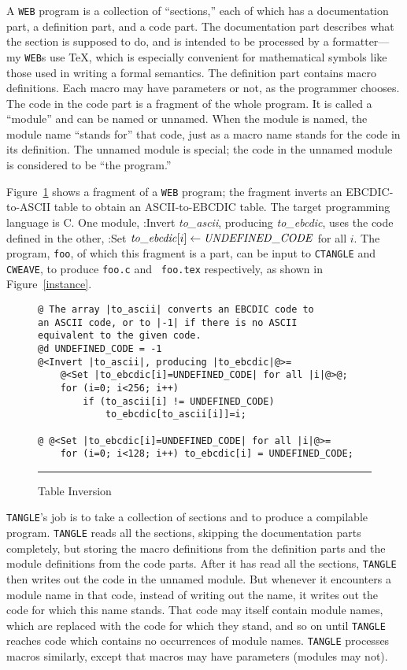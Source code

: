 A {\tt WEB} program is a collection of ``sections,'' each of which has a
documentation part, a definition part, and a code part.
The documentation part describes what the section is supposed to do,
and is intended to be processed by a formatter---my {\tt WEB}s use
{\TeX}, which is especially convenient for mathematical symbols like
those used in writing a formal semantics.
The definition part contains macro definitions.
Each macro may have parameters or not, as the programmer chooses.
The code in the code part is a fragment of the whole program.
It is called a ``module'' and can be named or unnamed.
When the module is named, the module name ``stands for'' that code,
just as a macro name stands for the code in its definition.
The unnamed module is special; the code in the unnamed module is
considered to be ``the program.''

Figure~\ref{fragment} shows a fragment of a {\tt WEB} program; the
fragment inverts an 
EBCDIC-to-ASCII table to obtain an ASCII-to-EBCDIC table.
The target programming language is C.
One module, \X:Invert {\it to\_ascii}, producing {\it to\_ebcdic}\X,
uses the code defined in the other, \X:Set ${\it
to\_ebcdic}[i]\leftarrow {\it UNDEFINED\_CODE}$ for all $i$\X.
The program, {\tt foo}, of which this fragment is a part, can be input
to {\tt CTANGLE} and {\tt CWEAVE}, to produce {\tt foo.c} and {\tt
foo.tex} respectively, as shown in Figure~\ref{instance}.

\begin{figure}
\caption{Table Inversion}
\label{fragment}
\begin{verbatim}
@ The array |to_ascii| converts an EBCDIC code to 
an ASCII code, or to |-1| if there is no ASCII 
equivalent to the given code.
@d UNDEFINED_CODE = -1
@<Invert |to_ascii|, producing |to_ebcdic|@>=
    @<Set |to_ebcdic[i]=UNDEFINED_CODE| for all |i|@>@;
    for (i=0; i<256; i++)
        if (to_ascii[i] != UNDEFINED_CODE)
            to_ebcdic[to_ascii[i]]=i;

@ @<Set |to_ebcdic[i]=UNDEFINED_CODE| for all |i|@>=
    for (i=0; i<128; i++) to_ebcdic[i] = UNDEFINED_CODE;
\end{verbatim}
\hrule
\end{figure}



{\tt TANGLE}'s job is to take a  collection of sections and to
produce a compilable program.
{\tt TANGLE} reads all the sections, skipping the documentation parts
completely, but storing the macro definitions from the definition parts
and the module definitions from the code parts.
After it has read all the sections, {\tt TANGLE} then
writes out the code in the unnamed module.
But whenever it encounters a module name in that code, instead of
writing out the name, it writes out the code for which this name
stands. 
That code may itself contain module names, which are replaced with the
code for which they stand, and so on until {\tt TANGLE} reaches code
which contains no occurrences of module names.
{\tt TANGLE} processes macros similarly, except that macros may
have parameters (modules may not).

